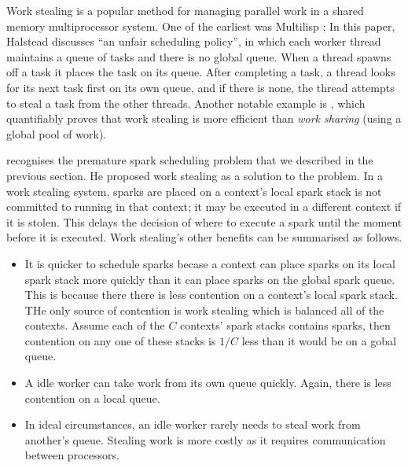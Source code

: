 
Work stealing is a popular method for managing parallel work in a shared
memory multiprocessor system.
One of the earliest was Multilisp \citep{halstead:1985:multilisp};
In this paper,
Halstead discusses ``an unfair scheduling policy'',
in which each worker thread maintains a queue of tasks
and there is no global queue.
When a thread spawns off a task it places the task on its queue.
After completing a task, a thread looks for its next task first
on its own queue, and if there is none,
the thread attempts to steal a task from the other threads.
Another notable example is
\citet{blumofe:1999:work-stealing},
which quantifiably proves that work stealing is more efficient than
\emph{work sharing}
(using a global pool of work).

\citet{wang:2006:hons} recognises the premature spark scheduling problem
that we described in the previous section.
He proposed work stealing as a solution to the problem.
In a work stealing system,
sparks are placed on a context's local spark stack
is not committed to running in that context;
it may be executed in a different context if it is stolen.
This delays the decision of where to execute a spark until the moment
before it is executed.
Work stealing's other benefits can be summarised as follows.

\begin{itemize}

    \item
    It is quicker to schedule sparks becase
    a context can place sparks on its local spark stack more quickly
    than it can place sparks on the global spark queue.
    This is because there there is less contention on a context's
    local spark stack.
    THe only source of contention is work stealing which is balanced all of
    the contexts.
    Assume each of the $C$ contexts' spark stacks contains sparks, then
    contention on any one of these stacks is $1/C$ less than it would be on
    a gobal queue.

    \item
    A idle worker can take work from its own queue quickly.
    Again, there is less contention on a local queue.

    \item
    In ideal circumstances,
    an idle worker rarely needs to steal work from another's queue.
    Stealing work is more costly as it requires communication between
    processors.

\end{itemize}

